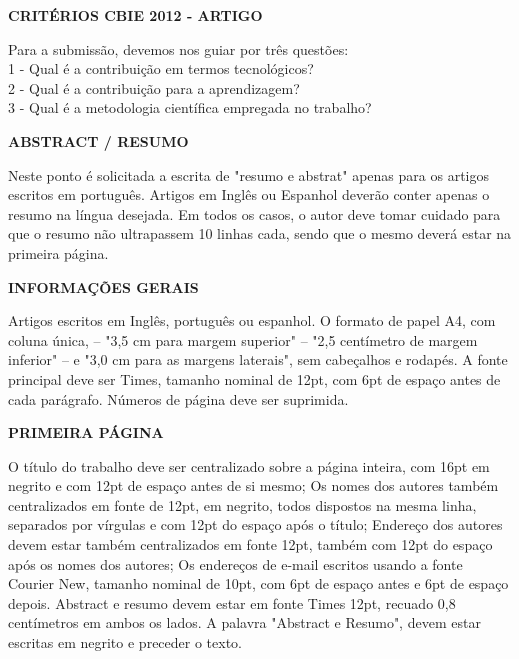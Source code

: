 \documentclass[a4paper,10pt]{article}
\begin{document}
\begin{flushleft}
\large\textbf{CRITÉRIOS CBIE 2012 - ARTIGO\\[0.5cm]}
\end{flushleft}

\begin{flushleft}
Para a submissão, devemos nos guiar por três questões:\\
1 - Qual é a contribuição em termos tecnológicos?\\
2 - Qual é a contribuição para a aprendizagem?\\
3 - Qual é a metodologia científica empregada no trabalho?\\
\end{flushleft}

\begin{flushleft}
\textbf{ABSTRACT / RESUMO}
\end{flushleft}

Neste ponto é solicitada a escrita de "resumo e abstrat" apenas para os artigos escritos em português. Artigos em Inglês ou Espanhol deverão conter apenas o resumo na língua desejada. Em todos os casos, o autor deve tomar cuidado para que o resumo não ultrapassem 10 linhas cada, sendo que o mesmo deverá estar na primeira página.\\  

\begin{flushleft}
\textbf{INFORMAÇÕES GERAIS}
\end{flushleft}

Artigos escritos em Inglês, português ou espanhol. O formato de papel A4, com coluna única, -- "3,5 cm para margem superior" --  "2,5 centímetro de margem inferior" -- e "3,0 cm para as margens laterais", sem cabeçalhos e rodapés. A fonte principal deve ser Times, tamanho nominal de 12pt, com 6pt de espaço antes de cada parágrafo. Números de página deve ser suprimida.\\

\begin{flushleft}
\textbf{PRIMEIRA PÁGINA}
\end{flushleft}

O título do trabalho deve ser centralizado sobre a página inteira, com 16pt em negrito e com 12pt de espaço antes de si mesmo; Os nomes dos autores também centralizados em fonte de 12pt, em negrito, todos dispostos na mesma linha, separados por vírgulas e com 12pt do espaço após o título; Endereço dos autores devem estar também centralizados em fonte 12pt, também com 12pt do espaço após os nomes dos autores; Os endereços de e-mail escritos usando a fonte Courier New, tamanho nominal de 10pt, com 6pt de espaço antes e 6pt de espaço depois. Abstract e resumo devem estar em fonte Times 12pt, recuado 0,8 centímetros em ambos os lados. A palavra "Abstract e Resumo", devem estar escritas em negrito e preceder o texto.\\
\end{document}
